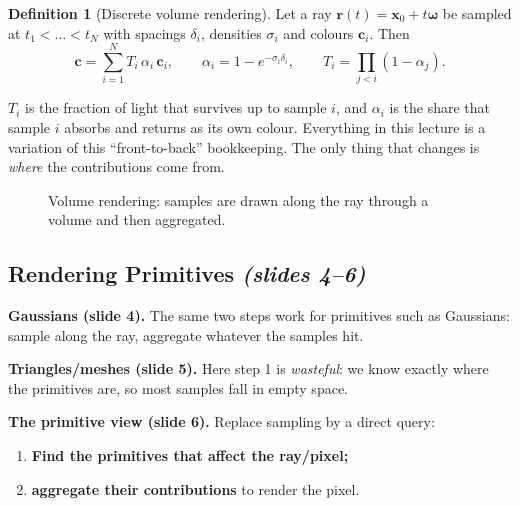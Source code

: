 \documentclass[11pt,a4paper]{article}
\newcommand{\sr}[1]{\texorpdfstring{\emph{(#1)}}{(#1)}}
\newcommand{\eye}[2]{\begin{scope}[shift={(#1,#2)}]
  \draw[thick,fill=white] (0,0) to[bend left=45] (0.7,0) to[bend left=45] (0,0);
  \fill[blue!45] (0.35,0) circle (0.09);\end{scope}}
\newcommand{\x}{{\bm{x}}}
\theoremstyle{definition}
\newtheorem{definition}{Definition}[section]
\theoremstyle{plain}
\theoremstyle{remark}
\begin{document}
\begin{definition}[Discrete volume rendering]
Let a ray $\bm r(t)=\bm x_0+t\bm\omega$ be sampled at $t_1<\dots<t_N$ with spacings $\delta_i$, densities $\sigma_i$ and colours $\bm c_i$. Then
\[
\bm c=\sum_{i=1}^{N}T_i\,\alpha_i\,\bm c_i,\qquad
\alpha_i=1-e^{-\sigma_i\delta_i},\qquad
T_i=\prod_{j<i}(1-\alpha_j).
\]
\end{definition}

\begin{intuition}
$T_i$ is the fraction of light that survives up to sample $i$, and $\alpha_i$ is the share that sample $i$ absorbs and returns as its own colour. Everything in this lecture is a variation of this ``front-to-back'' bookkeeping. The only thing that changes is \emph{where} the contributions come from.
\end{intuition}

\begin{figure}[htbp]
\centering
{}
\caption{Volume rendering: samples are drawn along the ray through a volume and then aggregated.}
\end{figure}

\subsection{Rendering Primitives \sr{slides 4--6}}
\textbf{Gaussians (slide 4).} The same two steps work for primitives such as Gaussians: sample along the ray, aggregate whatever the samples hit.

\textbf{Triangles/meshes (slide 5).} Here step 1 is \emph{wasteful}: we know exactly where the primitives are, so most samples fall in empty space.

\textbf{The primitive view (slide 6).} Replace sampling by a direct query:
\begin{enumerate}[nosep]
\item \textbf{Find the primitives that affect the ray/pixel;}
\item \textbf{aggregate their contributions} to render the pixel.
\end{enumerate}
\end{document}
